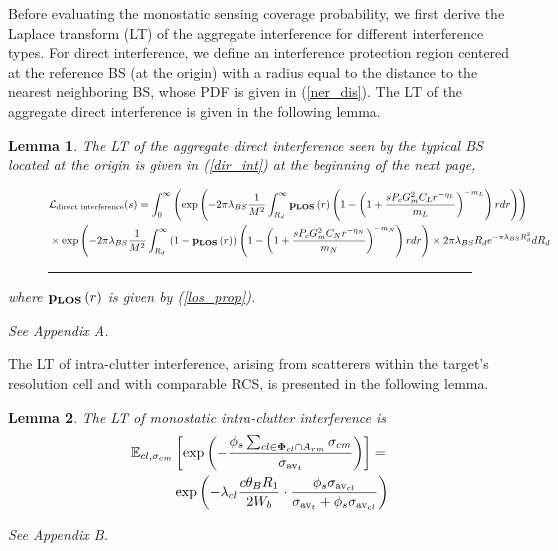 \documentclass[journal]{IEEEtran}
\newtheorem{lemma}{\textbf{Lemma}}
\begin{document}
Before evaluating the monostatic sensing coverage probability, we first derive the Laplace transform (LT) of the aggregate interference for different interference types. For direct interference, we define an interference protection region centered at the reference BS (at the origin) with a radius equal to the distance to the nearest neighboring BS, whose PDF is given in (\ref{ner_dis}). The LT of the aggregate direct interference is given in the following lemma.
\begin{lemma} \label{lemma_LT_DMR}
The LT of the aggregate direct interference seen by the typical BS located at the origin is given in (\ref{dir_int}) at the beginning of the next page,
\begin{figure*}[h]
\begin{equation}\label{dir_int}
\begin{aligned}
&\mathcal{L}_{\text{direct interference}}(s)= \int_{0}^\infty \left( \exp \left( - 2\pi \lambda_{BS} \frac{1}{M^2} \int_{R_d}^\infty \bold p_{\bold{LOS}}\left(r\right)  \left( 1 - \left( 1 + \frac{s P_c G_m^2 C_L r^{-\eta_L}}{m_L} \right)^{-m_L} \right) r dr \right) \right) \\
&\times \exp \left( - 2\pi \lambda_{BS} \frac{1}{M^2} \int_{R_d}^\infty \left( 1 - \bold p_{\bold{LOS}}\left(r\right)  \right) \left( 1 - \left( 1 + \frac{s P_c G_m^2 C_N r^{-\eta_N}}{m_N} \right)^{-m_N} \right) r dr \right) 
\times 2 \pi \lambda_{BS} R_d e^{-\pi \lambda_{BS} R_d^2} dR_d
\end{aligned}
\end{equation}
\hrule
\end{figure*}
where $\bold p_{\bold{LOS}}\left(r\right) $ is given by (\ref{los_prop}).
\begin{IEEEproof}
See Appendix A.
\end{IEEEproof}
\end{lemma}


The LT of intra-clutter interference, arising from scatterers within the target’s resolution cell and with comparable RCS, is presented in the following lemma.
\begin{lemma} \label{intra_clu}
The LT of monostatic intra-clutter interference is
\begin{equation}\label{intra_clu_int}
\begin{aligned}
\mathbb{E}_{cl, \sigma_{cm}} & \left[ \exp\left( - \frac{\phi_s \sum_{cl \in \bold\Phi_{cl} \cap A_{rm}} \sigma_{cm}}{\sigma_{\text{av}_t}} \right) \right] = \\
&\exp \left( - \lambda_{cl} \frac{c \theta_B R_1}{2 W_b} \cdot \frac{\phi_s  \sigma_{\text{av}_{cl}}}{\sigma_{\text{av}_t} + \phi_s  \sigma_{\text{av}_{cl}}} \right)
\end{aligned}
\end{equation}
\begin{IEEEproof}
See Appendix B.
\end{IEEEproof}
\end{lemma}
\end{document}
